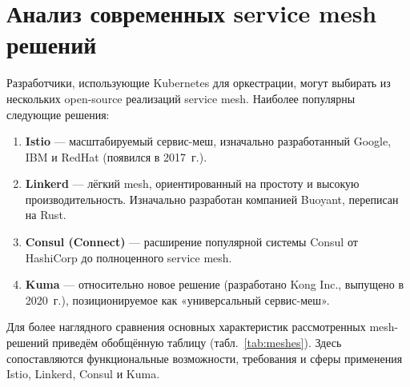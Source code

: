 \section{Анализ современных service mesh решений}


Разработчики, использующие Kubernetes для оркестрации, могут выбирать из нескольких open-source реализаций service mesh. Наиболее популярны следующие решения:

\begin{enumerate}
    \item \textbf{Istio} --- масштабируемый сервис-меш, изначально разработанный Google, IBM и RedHat (появился в 2017~г.). 
    
    \item \textbf{Linkerd} --- лёгкий mesh, ориентированный на простоту и высокую производительность. Изначально разработан компанией Buoyant, переписан на Rust.
    
    \item \textbf{Consul (Connect)} --- расширение популярной системы Consul от HashiCorp до полноценного service mesh. 
    
    \item \textbf{Kuma} --- относительно новое решение (разработано Kong Inc., выпущено в 2020~г.), позиционируемое как «универсальный сервис-меш». 
\end{enumerate}
Для более наглядного сравнения основных характеристик рассмотренных mesh-решений приведём обобщённую таблицу (табл.~\ref{tab:meshes}). Здесь сопоставляются функциональные возможности, требования и сферы применения Istio, Linkerd, Consul и Kuma.


